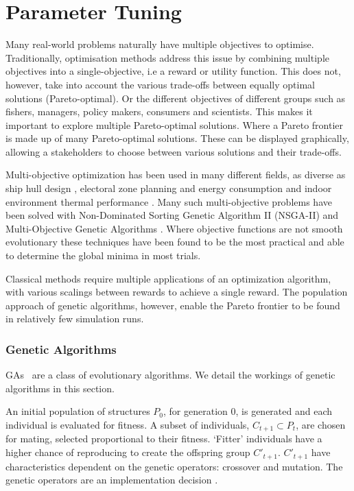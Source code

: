 \documentclass[12pt,doublespacing,a4paper]{ouparticle}
\begin{document}
\section{Parameter Tuning}

Many real-world problems naturally have multiple objectives to optimise. Traditionally, optimisation methods address this issue by combining multiple objectives into a single-objective, i.e a reward or utility function. This does not, however, take into account the various trade-offs between equally optimal solutions (Pareto-optimal). Or the different objectives of different groups such as fishers, managers, policy makers, consumers and scientists. This makes it important to explore multiple Pareto-optimal solutions. Where a Pareto frontier is made up of many Pareto-optimal solutions. These can be displayed graphically, allowing a stakeholders to choose between various solutions and their trade-offs.

Multi-objective optimization has been used in many different fields, as diverse as ship hull design \cite{Guha2015}, electoral zone planning \cite{Ponsich2017} and energy consumption and indoor environment thermal performance \cite{Yu2015a}. Many such multi-objective problems have been solved with Non-Dominated Sorting Genetic Algorithm II (NSGA-II) \cite{Valkanas2014} and Multi-Objective Genetic Algorithms \cite{T.MurataandH.Ishibuchi1995}. Where objective functions are not smooth evolutionary these techniques have been found to be the most practical and able to determine the global minima in most trials.

Classical methods require multiple applications of an optimization algorithm, with various scalings between rewards to achieve a single reward. The population approach of genetic algorithms, however, enable the Pareto frontier to be found in relatively few simulation runs.

\subsubsection{Genetic Algorithms}
GAs~\cite{Holland1975} are a class of evolutionary algorithms. We detail the workings of genetic algorithms in this section.

An initial population of structures $P_{0}$, for generation 0, is generated and each individual is evaluated for fitness. A subset of individuals, $C_{t+1} \subset P_{t}$, are chosen for mating, selected proportional to their fitness. `Fitter' individuals have a higher chance of reproducing to create the offspring group $C'_{t+1}$. $C'_{t+1}$ have characteristics dependent on the genetic operators: crossover and mutation. The genetic operators are an implementation decision \cite{FogelDavidB2009}. 
\end{document}
